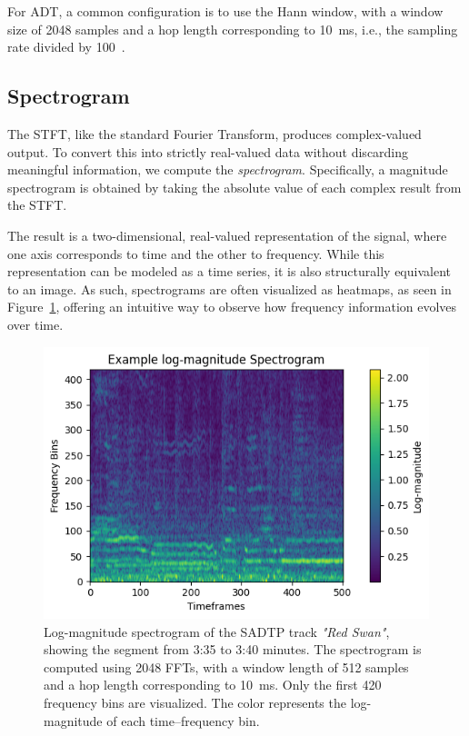 For \gls{ADT}, a common configuration is to use the Hann window, with a window size of 2048 samples and a hop length corresponding to 10~ms, i.e., the sampling rate divided by 100~\cite{8350302, vogl2016recurrent,vogl2018multiinstrumentdrumtranscription, signals4040042}.

\subsection{Spectrogram}

The \gls{STFT}, like the standard Fourier Transform, produces complex-valued output. To convert this into strictly real-valued data without discarding meaningful information, we compute the \textit{spectrogram}. Specifically, a magnitude spectrogram is obtained by taking the absolute value of each complex result from the \gls{STFT}.

The result is a two-dimensional, real-valued representation of the signal, where one axis corresponds to time and the other to frequency. While this representation can be modeled as a time series, it is also structurally equivalent to an image. As such, spectrograms are often visualized as heatmaps, as seen in Figure~\ref{SpectrogramFigure}, offering an intuitive way to observe how frequency information evolves over time.

\begin{figure}[H]
    \centering
    \includegraphics[scale=1.1]{figures/logspectrogram}
    \caption{Log-magnitude spectrogram of the SADTP track \textit{"Red Swan"}, showing the segment from 3:35 to 3:40 minutes. The spectrogram is computed using 2048 \glspl{FFT}, with a window length of 512 samples and a hop length corresponding to 10~ms. Only the first 420 frequency bins are visualized. The color represents the log-magnitude of each time–frequency bin.}
    \label{SpectrogramFigure}
\end{figure}

